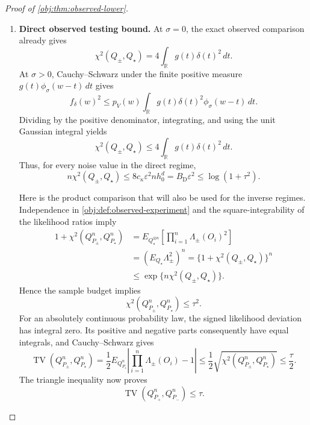 \documentclass[11pt]{article}
\begin{document}
\begin{proof}[Proof of \cref{obj:thm:observed-lower}]
\begin{enumerate}
\item \textbf{Direct observed testing bound.}
At \(\sigma=0\), the exact observed comparison already gives
\[
\chi^2(Q_\pm,Q_\star)
=4\int_{\mathbb R}g(t)\delta(t)^2\,dt.
\]
At \(\sigma>0\), Cauchy--Schwarz under the finite positive measure
\(g(t)\phi_\sigma(w-t)\,dt\) gives
\[
f_\delta(w)^2
\le
p_V(w)\int_{\mathbb R}
g(t)\delta(t)^2\phi_\sigma(w-t)\,dt.
\]
Dividing by the positive denominator, integrating, and using the unit Gaussian integral yields
\[
\chi^2(Q_\pm,Q_\star)
\le4\int_{\mathbb R}g(t)\delta(t)^2\,dt.
\]
Thus, for every noise value in the direct regime,
\[
n\chi^2(Q_\pm,Q_\star)
\le8c_\kappa\varepsilon^2nh_0^d
=B_{\mathrm D}\varepsilon^2
\le\log(1+\tau^2).
\]

Here is the product comparison that will also be used for the inverse regimes. Independence in \cref{obj:def:observed-experiment} and the square-integrability of the likelihood ratios imply
\[
\begin{aligned}
1+\chi^2(Q_{P_\pm}^n,Q_{P_\star}^n)
&=
E_{Q_\star^{\otimes n}}
\left[\prod_{i=1}^n\Lambda_\pm(O_i)^2\right]\\
&=
\left(E_{Q_\star}\Lambda_\pm^2\right)^n
=\{1+\chi^2(Q_\pm,Q_\star)\}^n\\
&\le\exp\{n\chi^2(Q_\pm,Q_\star)\}.
\end{aligned}
\]
Hence the sample budget implies
\[
\chi^2(Q_{P_\pm}^n,Q_{P_\star}^n)\le\tau^2.
\]
For an absolutely continuous probability law, the signed likelihood deviation has integral zero. Its positive and negative parts consequently have equal integrals, and Cauchy--Schwarz gives
\[
\operatorname{TV}(Q_{P_\pm}^n,Q_{P_\star}^n)
=
\frac12E_{Q_{P_\star}^n}
\left|\prod_{i=1}^n\Lambda_\pm(O_i)-1\right|
\le\frac12\sqrt{\chi^2(Q_{P_\pm}^n,Q_{P_\star}^n)}
\le\frac\tau2.
\]
The triangle inequality now proves
\[
\operatorname{TV}(Q_{P_+}^n,Q_{P_-}^n)\le\tau.
\]


\end{enumerate}
\end{proof}
\end{document}

